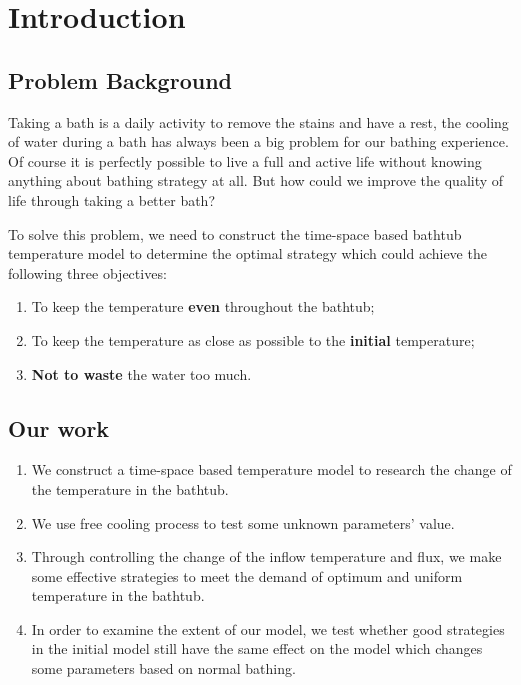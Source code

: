 \documentclass{HZNUMCM}
\begin{document}
\showSummarySheet
\showContents

\section{Introduction}
\subsection{Problem Background}
Taking a bath is a daily activity to remove the stains and have a rest, the cooling of water during
a bath has always been a big problem for our bathing experience. Of course it is perfectly possible
to live a full and active life without knowing anything about bathing strategy at all. But how could
we improve the quality of life through taking a better bath?

To solve this problem,  we need to construct the time-space based bathtub temperature model to
determine the optimal strategy which could achieve the following three objectives:
\begin{enumerate}[\quad\bf1.]
    \item To keep the temperature \textbf{even} throughout the bathtub;
    \item To keep the temperature as close as possible to the \textbf{initial} temperature;
    \item \textbf{Not to waste} the water too much.
\end{enumerate}

\subsection{Our work}
\begin{enumerate}[\bf 1.]
    \item We construct a time-space based temperature model to research the change of the
    temperature in the bathtub.
    \item We use free cooling process to test some unknown parameters' value.
    \item Through controlling the change of the inflow temperature and flux, we make some effective
    strategies to meet the demand of optimum and uniform temperature in the bathtub.
    \item In order to examine the extent of our model, we test whether good strategies in the
    initial model still have the same effect on the model which changes some parameters based on
    normal bathing.
\end{enumerate}
\end{document}
